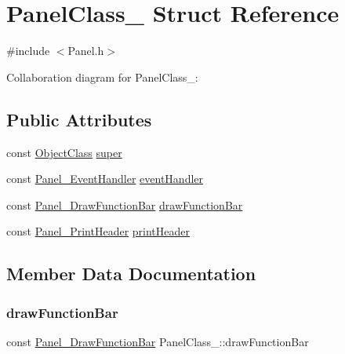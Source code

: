 \hypertarget{structPanelClass__}{}\section{Panel\+Class\+\_\+ Struct Reference}
\label{structPanelClass__}


{\ttfamily \#include $<$Panel.\+h$>$}



Collaboration diagram for Panel\+Class\+\_\+\+:
\subsection*{Public Attributes}
\begin{DoxyCompactItemize}
\item 
const \hyperlink{Object_8h_a6feb151c3b8f61fae503dfbcdc3d6a54}{Object\+Class} \hyperlink{structPanelClass___a7a3ad0dc4f1c536d08fe6348fc14bcef}{super}
\item 
const \hyperlink{Panel_8h_acfe8f6b671beb37355ed5a704780fdba}{Panel\+\_\+\+Event\+Handler} \hyperlink{structPanelClass___aeb5c12990c71db55b9bdc80c68d7be43}{event\+Handler}
\item 
const \hyperlink{Panel_8h_ac90c4b9b2fea9acfaf568f39333fe11b}{Panel\+\_\+\+Draw\+Function\+Bar} \hyperlink{structPanelClass___a2a699dad4ace8496052ef8167ce27739}{draw\+Function\+Bar}
\item 
const \hyperlink{Panel_8h_a143be7a202dfc77ec5c6ac300c8feda7}{Panel\+\_\+\+Print\+Header} \hyperlink{structPanelClass___aad2cc041d4b4c43125a319ad92125115}{print\+Header}
\end{DoxyCompactItemize}


\subsection{Member Data Documentation}
\mbox{\label{structPanelClass___a2a699dad4ace8496052ef8167ce27739}} 
\subsubsection{\texorpdfstring{draw\+Function\+Bar}{drawFunctionBar}}
{\footnotesize\ttfamily const \hyperlink{Panel_8h_ac90c4b9b2fea9acfaf568f39333fe11b}{Panel\+\_\+\+Draw\+Function\+Bar} Panel\+Class\+\_\+\+::draw\+Function\+Bar}

